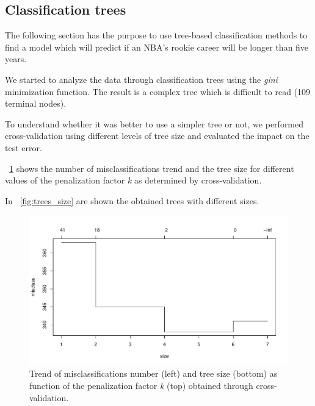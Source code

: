 \subsection{Classification trees}

The following section has the purpose to use tree-based classification methods to find a model which will predict if an NBA's rookie career will be longer than five years.

We started to analyze the data through classification trees using the \textit{gini} minimization function. The result is a complex tree which is difficult to read (109 terminal nodes).

To understand whether it was better to use a simpler tree or not, we performed cross-validation using different levels of tree size and evaluated the impact on the test error.

\Fig~\ref{fig:tree_cv_plot} shows the number of misclassifications trend and the tree size for different values of the penalization factor \textit{k} as determined by cross-validation. 

In \Fig~\ref{fig:trees_size} are shown the obtained trees with different sizes.

\begin{figure}[h]
	\centering
	\includegraphics[width=0.5\linewidth]{ImageFiles/Classification/Trees/tree_cv_plot.pdf}
	\caption{Trend of misclassifications number (left) and tree size (bottom) as function of the penalization factor \textit{k} (top) obtained through cross-validation.}
	\label{fig:tree_cv_plot}
\end{figure}

